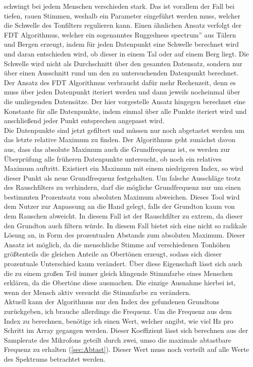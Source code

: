 schwingt bei jedem Menschen verschieden stark. Das ist vorallem der Fall bei tiefen, rauen Stimmen, weshalb ein Parameter eingeführt werden muss, welcher die Schwelle des Tonfilters regulieren kann. Einen ähnlichen Ansatz verfolgt der FDT Algorithmus, welcher ein sogenanntes \glqq Ruggedness spectrum'' aus Tälern und Bergen erzeugt, indem für jeden Datenpunkt eine Schwelle berechnet wird und daran entschieden wird, ob dieser in einem Tal oder auf einem Berg liegt. Die Schwelle wird nicht als Durchschnitt über den gesamten Datensatz, sondern nur über einen Ausschnitt rund um den zu untersuchenden Datenpunkt berechnet. Der Ansatz des FDT Algorithmus verbraucht dafür mehr Rechenzeit, denn es muss über jeden Datenpunkt iteriert werden und dann jeweils nocheinmal über die umliegenden Datensätze. Der hier vorgestelle Ansatz hingegen berechnet eine Konstante für alle Datenpunkte, indem einmal über alle Punkte iteriert wird und anschließend jeder Punkt entsprechen angepasst wird. \\
Die Datenpunkte sind jetzt gefiltert und müssen nur noch abgetastet werden um das letzte relative Maximum zu finden. Der Algorithmus geht zunächst davon aus, dass das absolute Maximum auch die Grundfrequenz ist, es werden zur Überprüfung alle früheren Datenpunkte untersucht, ob noch ein relatives Maximum auftritt. Existiert ein Maximum mit einem niedrigeren Index, so wird dieser Punkt als neue Grundfrequenz festgehalten. Um falsche Ausschläge trotz des Rauschfilters zu verhindern, darf die mögliche Grundfrequenz nur um einen bestimmten Prozentsatz vom absoluten Maximum abweichen. Dieses Tool wird dem Nutzer zur Anpassung an die Hand gelegt, falls der Grundton kaum von dem Rauschen abweicht. In diesem Fall ist der Rauschfilter zu extrem, da dieser den Grundton auch filtern würde. In diesem Fall bietet sich eine nicht so radikale Lösung an, in Form des prozentualen Abstands zum absoluten Maximum. Dieser Ansatz ist möglich, da die menschliche Stimme auf verschiedenen Tonhöhen größtenteils die gleichen Anteile an Obertönen erzeugt, sodass sich dieser prozentuale Unterschied kaum verändert. Über diese Eigenschaft lässt sich auch die zu einem großen Teil immer gleich klingende Stimmfarbe eines Menschen erklären, da die Obertöne diese ausmachen. Die einzige Ausnahme hierbei ist, wenn der Mensch aktiv versucht die Stimmfarbe zu verändern. \\
Aktuell kann der Algorithmus nur den Index des gefundenen Grundtons zurückgeben, ich brauche allerdings die Frequenz. Um die Frequenz aus dem Index zu berechnen, benötige ich einen Wert, welcher angibt, wie viel Hz pro Schritt im Array gegangen werden. Dieser Koeffizient lässt sich berechnen aus der Samplerate des Mikrofons geteilt durch zwei, umso die maximale abtastbare Frequenz zu erhalten (\ref{sec:Abtast}). Dieser Wert muss noch verteilt auf alle Werte des Spektrums betrachtet werden.
